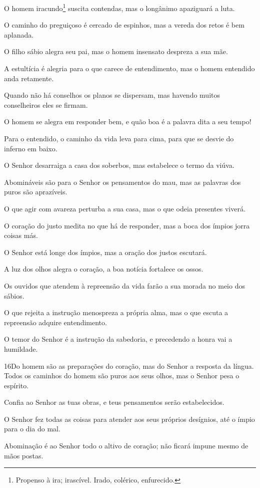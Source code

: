 O homem iracundo\footnote{Propenso à ira; irascível. Irado,
colérico, enfurecido.} suscita contendas, mas o longânimo apaziguará
a luta.

O caminho do preguiçoso é cercado de espinhos, mas a vereda dos
retos é bem aplanada.

O filho sábio alegra seu pai, mas o homem insensato despreza a
sua mãe.

A estultícia é alegria para o que carece de entendimento, mas o
homem entendido anda retamente.

Quando não há conselhos os planos se dispersam, mas havendo
muitos conselheiros eles se firmam.

O homem se alegra em responder bem, e quão boa é a palavra dita a
seu tempo!

Para o entendido, o caminho da vida leva para cima, para que se
desvie do inferno em baixo.

O Senhor desarraiga a casa dos soberbos, mas estabelece o termo
da viúva.

Abomináveis são para o Senhor os pensamentos do mau, mas as
palavras dos puros são aprazíveis.

O que agir com avareza perturba a sua casa, mas o que odeia
presentes viverá.

O coração do justo medita no que há de responder, mas a boca dos
ímpios jorra coisas más.

O Senhor está longe dos ímpios, mas a oração dos justos escutará.

A luz dos olhos alegra o coração, a boa notícia fortalece os
ossos.

Os ouvidos que atendem à repreensão da vida farão a sua morada no
meio dos sábios.

O que rejeita a instrução menospreza a própria alma, mas o que
escuta a repreensão adquire entendimento.

O temor do Senhor é a instrução da sabedoria, e precedendo a
honra vai a humildade.

\medskip

\lettrine{16}{}Do homem são as preparações do coração, mas do
Senhor a resposta da língua.  Todos os caminhos do
homem são puros aos seus olhos, mas o Senhor pesa o espírito.

Confia ao Senhor as tuas obras, e teus pensamentos serão
estabelecidos.

O Senhor fez todas as coisas para atender aos seus próprios
desígnios, até o ímpio para o dia do mal.

Abominação é ao Senhor todo o altivo de coração; não ficará impune
mesmo de mãos postas.

